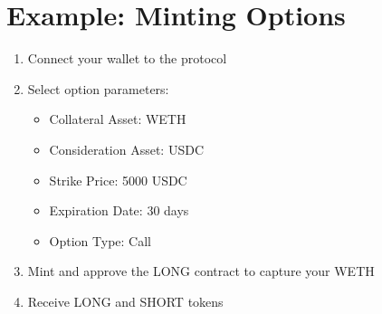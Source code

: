   \section{Example: Minting Options}

  \begin{enumerate}
  \item
    Connect your wallet to the protocol
  \item
    Select option parameters:
    \begin{itemize}
    \item
      Collateral Asset: WETH
    \item
      Consideration Asset: USDC
    \item
      Strike Price: 5000 USDC
    \item
      Expiration Date: 30 days
    \item
      Option Type: Call
    \end{itemize}
  \item
    Mint and approve the LONG contract to capture your WETH
  \item
    Receive LONG and SHORT tokens
  \end{enumerate}
  





